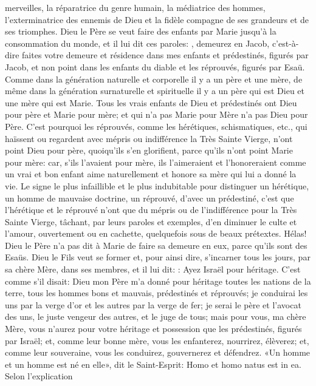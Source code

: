 merveilles, la réparatrice du genre humain, la médiatrice des hommes, l'exterminatrice des ennemis de Dieu et la
fidèle compagne de ses grandeurs et de ses triomphes.
 Dieu le Père se veut faire des enfants par Marie jusqu'à la consommation du monde, et il lui dit ces paroles: , demeurez en Jacob, c'est-à-dire faites votre demeure et résidence dans mes enfants et
prédestinés, figurés par Jacob, et non point dans les enfants du diable et les réprouvés, figurés par Esaü.
 Comme dans la génération naturelle et corporelle il y a un père et une mère, de même dans la génération
surnaturelle et spirituelle il y a un père qui est Dieu et une mère qui est Marie. Tous les vrais enfants de Dieu et
prédestinés ont Dieu pour père et Marie pour mère; et qui n'a pas Marie pour Mère n'a pas Dieu pour Père. C'est
pourquoi les réprouvés, comme les hérétiques, schismatiques, etc., qui haïssent ou regardent avec mépris ou
indifférence la Très Sainte Vierge, n'ont point Dieu pour père, quoiqu'ils s'en glorifient, parce qu'ils n'ont point Marie
pour mère: car, s'ils l'avaient pour mère, ils l'aimeraient et l'honoreraient comme un vrai et bon enfant aime
naturellement et honore sa mère qui lui a donné la vie.
Le signe le plus infaillible et le plus indubitable pour distinguer un hérétique, un homme de mauvaise doctrine, un
réprouvé, d'avec un prédestiné, c'est que l'hérétique et le réprouvé n'ont que du mépris ou de l'indifférence pour la
Très Sainte Vierge, tâchant, par leurs paroles et exemples, d'en diminuer le culte et l'amour, ouvertement ou en
cachette, quelquefois sous de beaux prétextes. Hélas! Dieu le Père n'a pas dit à Marie de faire sa demeure en
eux, parce qu'ils sont des Esaüs.
 Dieu le Fils veut se former et, pour ainsi dire, s'incarner tous les jours, par sa chère Mère, dans ses membres,
et il lui dit: : Ayez Israël pour héritage. C'est comme s'il disait: Dieu mon Père m'a donné pour
héritage toutes les nations de la terre, tous les hommes bons et mauvais, prédestinés et réprouvés; je conduirai les
uns par la verge d'or et les autres par la verge de fer; je serai le père et l'avocat des uns, le juste vengeur des
autres, et le juge de tous; mais pour vous, ma chère Mère, vous n'aurez pour votre héritage et possession que les
prédestinés, figurés par Israël; et, comme leur bonne mère, vous les enfanterez, nourrirez, élèverez; et, comme
leur souveraine, vous les conduirez, gouvernerez et défendrez.
 «Un homme et un homme est né en elle», dit le Saint-Esprit: Homo et homo natus est in ea. Selon l'explication
